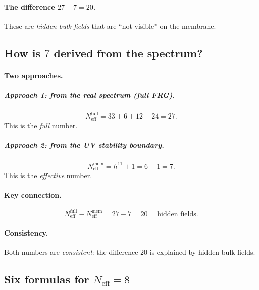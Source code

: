 \documentclass[11pt,a4paper]{article}
\newcommand{\Neff}{N_{\text{eff}}}
\theoremstyle{definition}
\begin{document}
\paragraph{The difference $27 - 7 = 20$.}
These are \emph{hidden bulk fields} that are ``not visible'' on the membrane.

\subsection{How is $7$ derived from the spectrum?}
\label{subsec:how-7-derived}

\paragraph{Two approaches.}

\subparagraph{Approach 1: from the real spectrum (full FRG).}
\begin{equation}
    \Neff^{\text{full}} = 33 + 6 + 12 - 24 = 27.
\end{equation}
This is the \emph{full} number.

\subparagraph{Approach 2: from the UV stability boundary.}
\begin{equation}
    \Neff^{\text{mem}} = h^{11} + 1 = 6 + 1 = 7.
\end{equation}
This is the \emph{effective} number.

\paragraph{Key connection.}
\begin{equation}
    \boxed{
    \Neff^{\text{full}} - \Neff^{\text{mem}} = 27 - 7 = 20 
    = \text{hidden fields}.
    }
\end{equation}

\paragraph{Consistency.}
Both numbers are \emph{consistent}: the difference $20$ is explained by 
hidden bulk fields.

\subsection{Six formulas for $\Neff = 8$}
\label{subsec:six-formulas-neff}
\end{document}
